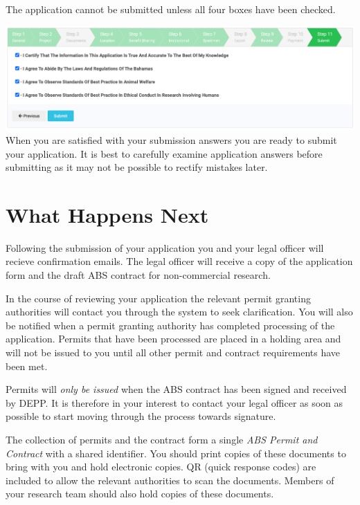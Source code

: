 \documentclass[
]{book}
\begin{document}
The application cannot be submitted unless all four boxes have been checked.

\includegraphics{images/submit.png}
When you are satisfied with your submission answers you are ready to submit your application. It is best to carefully examine application answers before submitting as it may not be possible to rectify mistakes later.

\hypertarget{what-happens-next}{%
\section{What Happens Next}\label{what-happens-next}}

Following the submission of your application you and your legal officer will recieve confirmation emails. The legal officer will receive a copy of the application form and the draft ABS contract for non-commercial research.

In the course of reviewing your application the relevant permit granting authorities will contact you through the system to seek clarification. You will also be notified when a permit granting authority has completed processing of the application. Permits that have been processed are placed in a holding area and will not be issued to you until all other permit and contract requirements have been met.

Permits will \emph{only be issued} when the ABS contract has been signed and received by DEPP. It is therefore in your interest to contact your legal officer as soon as possible to start moving through the process towards signature.

The collection of permits and the contract form a single \emph{ABS Permit and Contract} with a shared identifier. You should print copies of these documents to bring with you and hold electronic copies. QR (quick response codes) are included to allow the relevant authorities to scan the documents. Members of your research team should also hold copies of these documents.
\end{document}
